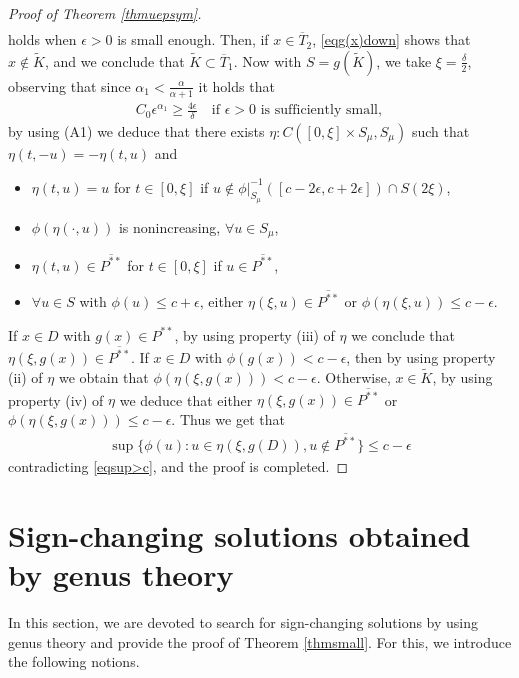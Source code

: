 \documentclass[10pt,a4paper]{article}
\theoremstyle{definition} \theoremstyle{remark}
\numberwithin{equation}{section}
\newcommand{\ep}{\epsilon}
\begin{document}
\begin{proof}[Proof of Theorem \ref{thmuepsym}]
\begin{align}
	\end{align}
	holds when $\ep > 0$ is small enough. Then, if $x \in \overline T_2$, \eqref{eqg(x)down} shows that $x \notin \tilde K$, and we conclude that $\tilde K \subset \overline T_1$. Now with $S = g(\tilde K)$, we take $\xi = \frac\delta2$, observing that since
	$\alpha_1 < \frac{\alpha}{\alpha +1}$ it holds that
	\begin{align*}
		C_0\ep^{\alpha_1} \geq \frac{4\ep}{\delta} \quad \text{if } \ep > 0 \text{ is sufficiently small},
	\end{align*}
	by using (A1) we deduce that there exists $\eta: C([0,\xi] \times S_\mu, S_\mu)$ such that $\eta(t,-u) = -\eta(t,u)$ and
	\begin{itemize}
		\item[(i)] $\eta(t,u) = u$ for $t \in [0,\xi]$ if $u \notin \phi|_{S_\mu}^{-1}([c-2\epsilon,c+2\epsilon]) \cap S(2\xi)$,
		\item[(ii)] $\phi(\eta(\cdot,u))$ is nonincreasing, $\forall u \in S_\mu$,
		\item[(iii)] $\eta(t,u) \in \overline{P^{**}}$ for $t \in [0,\xi]$ if $u \in \overline{P^{**}}$,
		\item[(iv)] $\forall u \in S$ with $\phi(u) \leq c + \epsilon$, either $\eta(\xi,u) \in \overline{P^{**}}$ or $\phi(\eta(\xi,u)) \leq c -\epsilon$.
	\end{itemize}
	If $x \in D$ with $g(x) \in P^{**}$, by using property (iii) of $\eta$ we conclude that $\eta(\xi,g(x)) \in \overline{P^{**}}$. If $x \in D$ with $\phi(g(x)) < c -\ep$, then by using property (ii) of $\eta$ we obtain that $\phi(\eta(\xi,g(x))) < c -\ep$. Otherwise, $x \in \tilde K$, by using property (iv) of $\eta$ we deduce that either $\eta(\xi,g(x)) \in \overline{P^{**}}$ or $\phi(\eta(\xi,g(x))) \leq c-\ep$. Thus we get that
	\begin{align*}
		\sup\bigl\{\phi(u): u \in \eta(\xi,g(D)), u \notin \overline{P^{**}} \bigr\} \le c-\ep
	\end{align*}
	contradicting \eqref{eqsup>c}, and the proof is completed.
\end{proof}

\section{Sign-changing solutions obtained by genus theory} \label{secgenus}

In this section, we are devoted to search for sign-changing solutions by using genus theory and provide the proof of Theorem \ref{thmsmall}. For this, we introduce the following notions.
\end{document}

